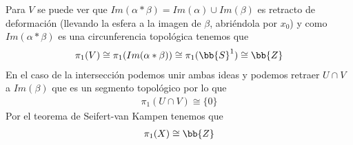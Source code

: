 \begin{ejemplo}
\begin{enumerate}
\begin{figure}[H]
        \end{figure}
        Para $V$ se puede ver que $Im(\alpha \ast \beta) = Im(\alpha)\cup Im(\beta)$ es retracto de deformación (llevando la esfera a la imagen de $\beta$, abriéndola por $x_0$) y como $Im(\alpha \ast \beta)$ es una circunferencia topológica tenemos que 
        \begin{gather*}
            \pi_1(V) \cong \pi_1(Im(\alpha \ast \beta)) \cong \pi_1(\bb{S}^1) \cong \bb{Z}
        \end{gather*}
        En el caso de la intersección podemos unir ambas ideas y podemos retraer $U\cap V$ a $Im(\beta)$ que es un segmento topológico por lo que 
        \begin{gather*}
            \pi_1(U\cap V) \cong \{0\}
        \end{gather*}
        Por el teorema de Seifert-van Kampen tenemos que 
        \begin{gather*}
            \pi_1(X)\cong \bb{Z}
        \end{gather*}
    \end{enumerate}
\end{ejemplo}

